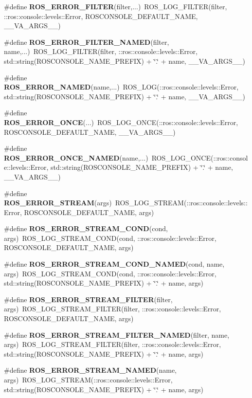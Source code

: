 \begin{DoxyCompactItemize}
\item 
\#define {\bf ROS\_\-ERROR\_\-FILTER}(filter,...)~ROS\_\-LOG\_\-FILTER(filter, ::ros::console::levels::Error, ROSCONSOLE\_\-DEFAULT\_\-NAME, \_\-\_\-VA\_\-ARGS\_\-\_\-)
\item 
\#define {\bf ROS\_\-ERROR\_\-FILTER\_\-NAMED}(filter, name,...)~ROS\_\-LOG\_\-FILTER(filter, ::ros::console::levels::Error, std::string(ROSCONSOLE\_\-NAME\_\-PREFIX) + \char`\"{}.\char`\"{} + name, \_\-\_\-VA\_\-ARGS\_\-\_\-)
\item 
\#define {\bf ROS\_\-ERROR\_\-NAMED}(name,...)~ROS\_\-LOG(::ros::console::levels::Error, std::string(ROSCONSOLE\_\-NAME\_\-PREFIX) + \char`\"{}.\char`\"{} + name, \_\-\_\-VA\_\-ARGS\_\-\_\-)
\item 
\#define {\bf ROS\_\-ERROR\_\-ONCE}(...)~ROS\_\-LOG\_\-ONCE(::ros::console::levels::Error, ROSCONSOLE\_\-DEFAULT\_\-NAME, \_\-\_\-VA\_\-ARGS\_\-\_\-)
\item 
\#define {\bf ROS\_\-ERROR\_\-ONCE\_\-NAMED}(name,...)~ROS\_\-LOG\_\-ONCE(::ros::console::levels::Error, std::string(ROSCONSOLE\_\-NAME\_\-PREFIX) + \char`\"{}.\char`\"{} + name, \_\-\_\-VA\_\-ARGS\_\-\_\-)
\item 
\#define {\bf ROS\_\-ERROR\_\-STREAM}(args)~ROS\_\-LOG\_\-STREAM(::ros::console::levels::Error, ROSCONSOLE\_\-DEFAULT\_\-NAME, args)
\item 
\#define {\bf ROS\_\-ERROR\_\-STREAM\_\-COND}(cond, args)~ROS\_\-LOG\_\-STREAM\_\-COND(cond, ::ros::console::levels::Error, ROSCONSOLE\_\-DEFAULT\_\-NAME, args)
\item 
\#define {\bf ROS\_\-ERROR\_\-STREAM\_\-COND\_\-NAMED}(cond, name, args)~ROS\_\-LOG\_\-STREAM\_\-COND(cond, ::ros::console::levels::Error, std::string(ROSCONSOLE\_\-NAME\_\-PREFIX) + \char`\"{}.\char`\"{} + name, args)
\item 
\#define {\bf ROS\_\-ERROR\_\-STREAM\_\-FILTER}(filter, args)~ROS\_\-LOG\_\-STREAM\_\-FILTER(filter, ::ros::console::levels::Error, ROSCONSOLE\_\-DEFAULT\_\-NAME, args)
\item 
\#define {\bf ROS\_\-ERROR\_\-STREAM\_\-FILTER\_\-NAMED}(filter, name, args)~ROS\_\-LOG\_\-STREAM\_\-FILTER(filter, ::ros::console::levels::Error, std::string(ROSCONSOLE\_\-NAME\_\-PREFIX) + \char`\"{}.\char`\"{} + name, args)
\item 
\#define {\bf ROS\_\-ERROR\_\-STREAM\_\-NAMED}(name, args)~ROS\_\-LOG\_\-STREAM(::ros::console::levels::Error, std::string(ROSCONSOLE\_\-NAME\_\-PREFIX) + \char`\"{}.\char`\"{} + name, args)
\item 

\end{DoxyCompactItemize}
